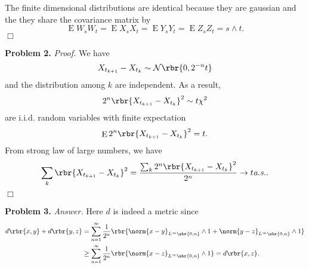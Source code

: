 \documentclass[english, nochinese]{pnote}
\newcommand\noteas{\text{\textit{a.s.}}}
\DeclareMathOperator\ope{\mathrm{E}}
\begin{document}
The finite dimensional distributions are identical because they are gaussian and the they share the covariance matrix by
\begin{equation}
\ope W_s W_t = \ope X_s X_t = \ope Y_s Y_t = \ope Z_s Z_t = s \wedge t.
\end{equation}
\hfill$\Box$

\textbf{Problem 2.} \textit{Proof.} We have
\begin{equation}
X_{t_{ k + 1 }} - X_{t_k} \sim \mathcal{N} \rbr{ 0, 2^{-n} t }
\end{equation}
and the distribution among $k$ are independent. As a result,
\begin{equation}
2^n \rbr{ X_{t_{ k + 1 }} - X_{t_k} }^2 \sim t \chi^2
\end{equation}
are i.i.d. random variables with finite expectation
\begin{equation}
\ope 2^n \rbr{ X_{t_{ k + 1 }} - X_{t_k} }^2 = t.
\end{equation}
From strong law of large numbers, we have
\begin{equation}
\sum_k \rbr{ X_{t_{ k + 1 }} - X_{t_k} }^2 = \frac{ \sum_k 2^n \rbr{ X_{t_{ k + 1 }} - X_{t_k} }^2 }{2^n} \rightarrow t \noteas.
\end{equation}
\hfill$\Box$

\textbf{Problem 3.} \textit{Answer.} Here $d$ is indeed a metric since
\begin{equation}
\begin{split}
d \rbr{ x, y } + d \rbr{ y, z } &= \sum_{ n = 1 }^{\infty} \frac{1}{2^n} \rbr{ \norm{ x - y }_{ L^{\infty} \sbr{ 0, n } } \wedge 1 + \norm{ y - z }_{ L^{\infty} \sbr{ 0, n } } \wedge 1 } \\
&\ge \sum_{ n = 1 }^{\infty} \frac{1}{2^n} \rbr{ \norm{ x - z }_{ L^{\infty} \sbr{ 0, n } } \wedge 1 } = d \rbr{ x, z }.
\end{split}
\end{equation}
\end{document}
